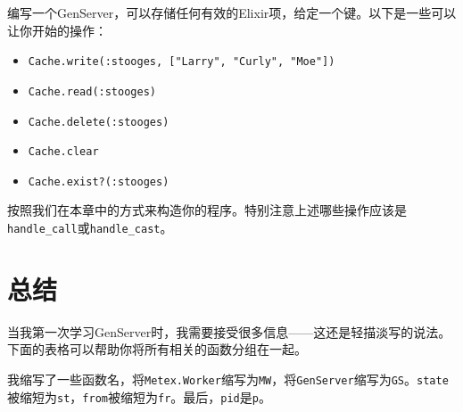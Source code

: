 编写一个GenServer，可以存储任何有效的Elixir项，给定一个键。以下是一些可以让你开始的操作：

\begin{itemize}
\item  \texttt{Cache.write(:stooges, ["Larry", "Curly", "Moe"])}
\item  \texttt{Cache.read(:stooges)}
\item  \texttt{Cache.delete(:stooges)}
\item  \texttt{Cache.clear}
\item  \texttt{Cache.exist?(:stooges)}
\end{itemize}

按照我们在本章中的方式来构造你的程序。特别注意上述哪些操作应该是\texttt{handle\_call}或\texttt{handle\_cast}。

\section{总结}

当我第一次学习GenServer时，我需要接受很多信息------这还是轻描淡写的说法。下面的表格可以帮助你将所有相关的函数分组在一起。

我缩写了一些函数名，将\texttt{Metex.Worker}缩写为\texttt{MW}，将\texttt{GenServer}缩写为\texttt{GS}。\texttt{state}被缩短为\texttt{st}，\texttt{from}被缩短为\texttt{fr}。最后，\texttt{pid}是\texttt{p}。


